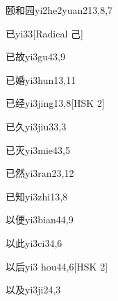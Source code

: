 \begin{entry}{颐和园}{yi2he2yuan2}{13,8,7}
\end{entry}

\begin{entry}{已}{yi3}{3}[Radical 己]
\end{entry}

\begin{entry}{已故}{yi3gu4}{3,9}
\end{entry}

\begin{entry}{已婚}{yi3hun1}{3,11}
\end{entry}

\begin{entry}{已经}{yi3jing1}{3,8}[HSK 2]
\end{entry}

\begin{entry}{已久}{yi3jiu3}{3,3}
\end{entry}

\begin{entry}{已灭}{yi3mie4}{3,5}
\end{entry}

\begin{entry}{已然}{yi3ran2}{3,12}
\end{entry}

\begin{entry}{已知}{yi3zhi1}{3,8}
\end{entry}

\begin{entry}{以便}{yi3bian4}{4,9}
\end{entry}

\begin{entry}{以此}{yi3ci3}{4,6}
\end{entry}

\begin{entry}{以后}{yi3 hou4}{4,6}[HSK 2]
\end{entry}

\begin{entry}{以及}{yi3ji2}{4,3}
\end{entry}

